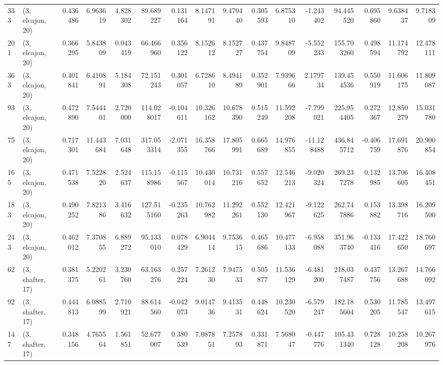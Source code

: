 \begin{tabular}{llrrrrrrrrrrrrrr}
333 &  (3, elcajon, 20) &   0.436486 &   6.963619 &   4.828302 &    89.689227 &   0.131164 &   8.147191 &   9.470440 &  0.305593 &   6.875310 &  -1.243402 &    94.445520 &   0.695860 &   9.638437 &   9.718309 \\
201 &  (3, elcajon, 20) &   0.366295 &   5.843809 &   0.043419 &    66.466960 &   0.356122 &   8.152612 &   8.152727 &  0.437754 &   9.848709 &  -5.552233 &   155.703260 &   0.498594 &  11.174792 &  12.478111 \\
363 &  (3, elcajon, 20) &   0.401841 &   6.410891 &   5.184308 &    72.151243 &   0.301057 &   6.728610 &   8.494189 &  0.352901 &   7.939666 &   2.179734 &   139.454536 &   0.550919 &  11.606175 &  11.809087 \\
93  &  (3, elcajon, 20) &   0.472890 &   7.544401 &   2.720000 &   114.028017 &  -0.104611 &  10.326162 &  10.678390 &  0.515249 &  11.592208 &  -7.799021 &   225.954405 &   0.272367 &  12.850279 &  15.031780 \\
75  &  (3, elcajon, 20) &   0.717301 &  11.443684 &   7.031648 &   317.053314 &  -2.071355 &  16.358766 &  17.805991 &  0.665689 &  14.976855 & -11.128488 &   436.845712 &  -0.406759 &  17.691876 &  20.900854 \\
165 &  (3, elcajon, 20) &   0.471538 &   7.522820 &   2.524637 &   115.158986 &  -0.115567 &  10.430014 &  10.731216 &  0.557652 &  12.546213 &  -9.020324 &   269.237278 &   0.132985 &  13.706605 &  16.408451 \\
183 &  (3, elcajon, 20) &   0.490252 &   7.821386 &   3.416632 &   127.515160 &  -0.235263 &  10.762982 &  11.292261 &  0.552130 &  12.421967 &  -9.122625 &   262.747886 &   0.153882 &  13.398716 &  16.209500 \\
243 &  (3, elcajon, 20) &   0.462012 &   7.370855 &   6.889272 &    95.133010 &   0.078429 &   6.904414 &   9.753615 &  0.465686 &  10.477133 &  -6.958088 &   351.963740 &  -0.133416 &  17.422650 &  18.760697 \\
62  &  (3, shafter, 17) &   0.381375 &   5.220261 &   3.230760 &    63.163276 &   0.257224 &   7.261230 &   7.947533 &  0.505877 &  11.536129 &  -6.481200 &   218.037487 &   0.437756 &  13.267688 &  14.766092 \\
92  &  (3, shafter, 17) &   0.444813 &   6.088599 &   2.710921 &    88.614560 &  -0.042073 &   9.014736 &   9.413531 &  0.448624 &  10.230520 &  -6.579247 &   182.185604 &   0.530205 &  11.785547 &  13.497615 \\
147 &  (3, shafter, 17) &   0.348156 &   4.765564 &   1.561851 &    52.677007 &   0.380539 &   7.087851 &   7.257893 &  0.331871 &   7.568047 &  -0.447776 &   105.431340 &   0.728128 &  10.258208 &  10.267976 \\

\end{tabular}
